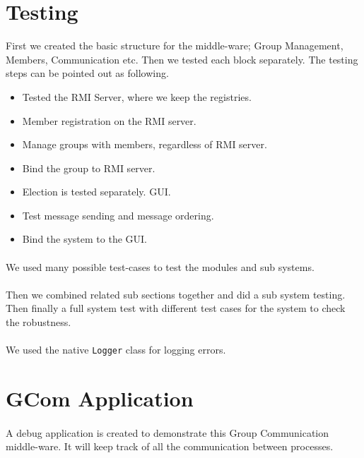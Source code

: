 \documentclass[a4paper,english,twoside]{article}
\begin{document}
\section{Testing}
First we created the basic structure for the middle-ware; Group Management, Members, Communication etc. Then we tested each block separately. The testing steps can be pointed out as following.

\begin{itemize}
\item Tested the RMI Server, where we keep the registries.
\item Member registration on the RMI server.
\item Manage groups with members, regardless of RMI server.
\item Bind the group to RMI server.
\item Election is tested separately. GUI.
\item Test message sending and message ordering.
\item Bind the system to the GUI.
\paragraph{}
\end{itemize}

We used many possible test-cases to test the modules and sub systems.
\paragraph{}
Then we combined related sub sections together and did a sub system testing. Then finally a full system test with different test cases for the system to check the robustness.

\paragraph{}
We used the native \texttt{Logger} class for logging errors.

\newpage
\section{GCom Application}
\paragraph{}
A debug application is created to demonstrate this Group Communication middle-ware. It will keep track of all the communication between processes.
\end{document}
